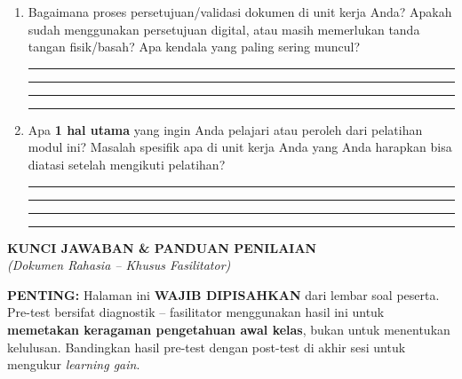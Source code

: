 \documentclass[12pt,a4paper]{report}
\begin{document}
\begin{enumerate}[leftmargin=*, itemsep=0.3cm]
\item Bagaimana proses persetujuan/validasi dokumen di unit kerja Anda? Apakah sudah menggunakan persetujuan digital, atau masih memerlukan tanda tangan fisik/basah? Apa kendala yang paling sering muncul?

\vspace{0.2cm}
\noindent\rule{\textwidth}{0.3pt}
\vspace{0.5cm}
\noindent\rule{\textwidth}{0.3pt}
\vspace{0.5cm}
\noindent\rule{\textwidth}{0.3pt}
\vspace{0.5cm}
\noindent\rule{\textwidth}{0.3pt}

\item Apa \textbf{1 hal utama} yang ingin Anda pelajari atau peroleh dari pelatihan modul ini? Masalah spesifik apa di unit kerja Anda yang Anda harapkan bisa diatasi setelah mengikuti pelatihan?

\vspace{0.2cm}
\noindent\rule{\textwidth}{0.3pt}
\vspace{0.5cm}
\noindent\rule{\textwidth}{0.3pt}
\vspace{0.5cm}
\noindent\rule{\textwidth}{0.3pt}
\vspace{0.5cm}
\noindent\rule{\textwidth}{0.3pt}

\end{enumerate}

\newpage
\begin{center}
{\LARGE\bfseries\color{red!70!black} KUNCI JAWABAN \& PANDUAN PENILAIAN}\\[0.2cm]
{\large\color{red!70!black}\textit{(Dokumen Rahasia -- Khusus Fasilitator)}}
\end{center}

\vspace{0.5cm}

\begin{answerbox}
\textbf{PENTING:} Halaman ini \textbf{WAJIB DIPISAHKAN} dari lembar soal peserta. Pre-test bersifat diagnostik -- fasilitator menggunakan hasil ini untuk \textbf{memetakan keragaman pengetahuan awal kelas}, bukan untuk menentukan kelulusan. Bandingkan hasil pre-test dengan post-test di akhir sesi untuk mengukur \textit{learning gain}.
\end{answerbox}

\vspace{0.5cm}
\end{document}
